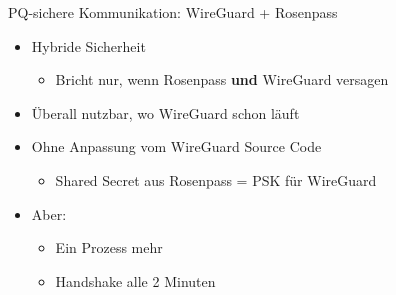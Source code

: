 \documentclass{rosenpass-beamer}
\begin{document}
\begin{frame}{PQ-sichere Kommunikation: WireGuard + Rosenpass}
\begin{itemize}
\item  Hybride Sicherheit

  \begin{itemize}
    \item Bricht nur, wenn Rosenpass \textbf{und} WireGuard versagen
  \end{itemize}
\item  Überall nutzbar, wo WireGuard schon läuft
\item  Ohne Anpassung vom WireGuard Source Code

  \begin{itemize}
    \item Shared Secret aus Rosenpass = PSK für WireGuard
  \end{itemize}
\item  Aber:

  \begin{itemize}
    \item Ein Prozess mehr
  \item Handshake alle 2 Minuten
  \end{itemize}
\end{itemize}


\end{frame}
\end{document}
